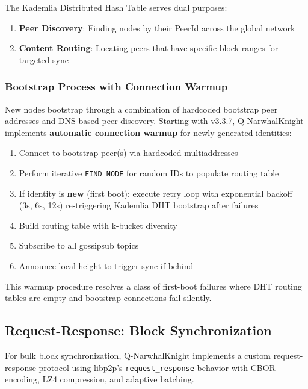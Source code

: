 \documentclass[11pt,a4paper]{article}
\begin{document}
The Kademlia Distributed Hash Table serves dual purposes:

\begin{enumerate}
    \item \textbf{Peer Discovery}: Finding nodes by their PeerId across the global network
    \item \textbf{Content Routing}: Locating peers that have specific block ranges for targeted sync
\end{enumerate}

\subsubsection{Bootstrap Process with Connection Warmup}

New nodes bootstrap through a combination of hardcoded bootstrap peer addresses and DNS-based peer discovery. Starting with v3.3.7, Q-NarwhalKnight implements \textbf{automatic connection warmup} for newly generated identities:

\begin{enumerate}
    \item Connect to bootstrap peer(s) via hardcoded multiaddresses
    \item Perform iterative \texttt{FIND\_NODE} for random IDs to populate routing table
    \item If identity is \textbf{new} (first boot): execute retry loop with exponential backoff (3s, 6s, 12s) re-triggering Kademlia DHT bootstrap after failures
    \item Build routing table with k-bucket diversity
    \item Subscribe to all gossipsub topics
    \item Announce local height to trigger sync if behind
\end{enumerate}

This warmup procedure resolves a class of first-boot failures where DHT routing tables are empty and bootstrap connections fail silently.

\subsection{Request-Response: Block Synchronization}

For bulk block synchronization, Q-NarwhalKnight implements a custom request-response protocol using libp2p's \texttt{request\_response} behavior with CBOR encoding, LZ4 compression, and adaptive batching.
\end{document}
